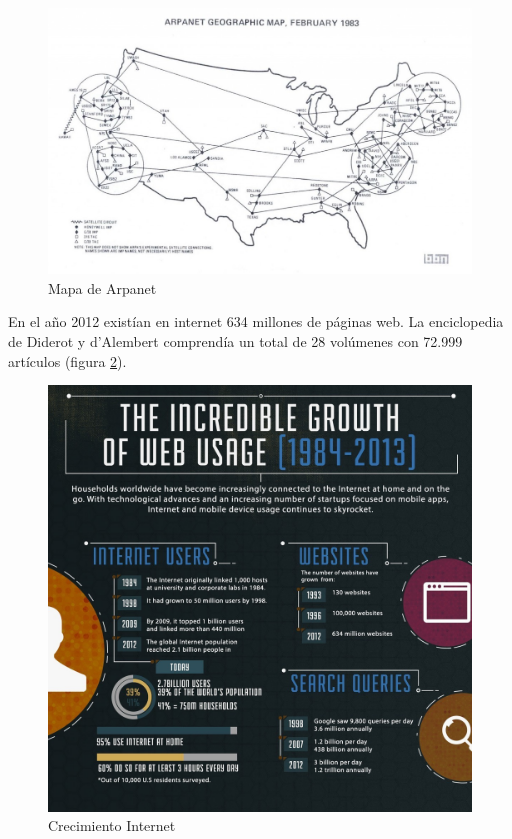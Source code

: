 \begin{figure}[hbtp]
\centering
\includegraphics[width=160mm, fbox={\fboxrule} 4mm]{images/introduccion/Mapa_de_Arpanet.jpg}
\caption{Mapa de Arpanet}
\label{fig:Arpanet}
\end{figure}


En el año 2012 existían en internet 634 millones de páginas web. La enciclopedia de Diderot y d'Alembert comprendía un total de 28 volúmenes con 72.999 artículos (figura \ref{fig:Crecimiento_Internet}). %

\begin{figure}[hbtp]
\centering
\includegraphics[width=150mm, fbox={\fboxrule} 0pt]{images/introduccion/Grafico_paginas_web.jpg}
\caption{Crecimiento Internet}
\label{fig:Crecimiento_Internet}
\end{figure}


